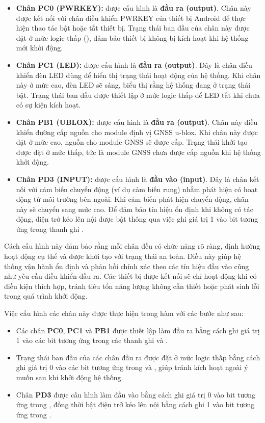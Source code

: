 \documentclass[../DoAn.tex]{subfiles}
\begin{document}
\begin{itemize}
    \item \textbf{Chân PC0 (PWRKEY):} được cấu hình là \textbf{đầu ra (output)}. Chân này được kết nối với chân điều khiển PWRKEY của thiết bị Android để thực hiện thao tác bật hoặc tắt thiết bị. Trạng thái ban đầu của chân này được đặt ở mức logic thấp (), đảm bảo thiết bị không bị kích hoạt khi hệ thống mới khởi động.
    
    \item \textbf{Chân PC1 (LED):} được cấu hình là \textbf{đầu ra (output)}. Đây là chân điều khiển đèn LED dùng để hiển thị trạng thái hoạt động của hệ thống. Khi chân này ở mức cao, đèn LED sẽ sáng, biểu thị rằng hệ thống đang ở trạng thái bật. Trạng thái ban đầu được thiết lập ở mức logic thấp để LED tắt khi chưa có sự kiện kích hoạt.

    \item \textbf{Chân PB1 (UBLOX):} được cấu hình là \textbf{đầu ra (output)}. Chân này điều khiển đường cấp nguồn cho module định vị GNSS u-blox. Khi chân này được đặt ở mức cao, nguồn cho module GNSS sẽ được cấp. Trạng thái khởi tạo được đặt ở mức thấp, tức là module GNSS chưa được cấp nguồn khi hệ thống khởi động.
    
    \item \textbf{Chân PD3 (INPUT):} được cấu hình là \textbf{đầu vào (input)}. Đây là chân kết nối với cảm biến chuyển động (ví dụ cảm biến rung) nhằm phát hiện có hoạt động từ môi trường bên ngoài. Khi cảm biến phát hiện chuyển động, chân này sẽ chuyển sang mức cao. Để đảm bảo tín hiệu ổn định khi không có tác động, điện trở kéo lên nội được bật thông qua việc ghi giá trị 1 vào bit tương ứng trong thanh ghi .
\end{itemize}

Cách cấu hình này đảm bảo rằng mỗi chân đều có chức năng rõ ràng, định hướng hoạt động cụ thể và được khởi tạo với trạng thái an toàn. Điều này giúp hệ thống vận hành ổn định và phản hồi chính xác theo các tín hiệu đầu vào cũng như yêu cầu điều khiển đầu ra. Các thiết bị được kết nối sẽ chỉ hoạt động khi có điều kiện thích hợp, tránh tiêu tốn năng lượng không cần thiết hoặc phát sinh lỗi trong quá trình khởi động.

Việc cấu hình các chân này được thực hiện trong hàm  với các bước như sau:

\begin{itemize}
    \item Các chân \textbf{PC0}, \textbf{PC1} và \textbf{PB1} được thiết lập làm đầu ra bằng cách ghi giá trị 1 vào các bit tương ứng trong các thanh ghi  và .
    \item Trạng thái ban đầu của các chân đầu ra được đặt ở mức logic thấp bằng cách ghi giá trị 0 vào các bit tương ứng trong  và , giúp tránh kích hoạt ngoài ý muốn sau khi khởi động hệ thống.
    \item Chân \textbf{PD3} được cấu hình làm đầu vào bằng cách ghi giá trị 0 vào bit tương ứng trong , đồng thời bật điện trở kéo lên nội bằng cách ghi 1 vào bit tương ứng trong .
\end{itemize}
\end{document}
